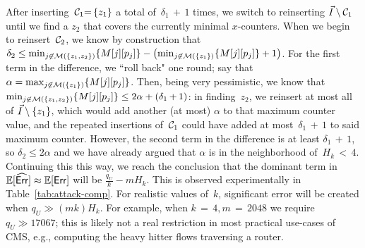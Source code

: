 After inserting~$\mathcal{C}_1{=}\,\{z_1\}$ a total of~$\delta_1\,{+}\,1$ times, we switch to reinserting $\vec{I}\setminus \mathcal{C}_1$ until we find a $z_2$ that covers the currently minimal $x$-counters.  When we begin to reinsert~$\mathcal{C}_2$, we know by construction that $\delta_2 \leq \min_{j \not\in \mathcal{M}(\{z_1,z_2\})}\{M[j][p_j]\} - \left(\min_{j \not\in \mathcal{M}(\{z_1\})}\{M[j][p_j]\}+1\right)$.  For the first term in the difference, we ``roll back" one round; say that $\alpha=\max_{j \not\in \mathcal{M}(\{z_1\})}\{M[j][p_j]\}$. Then, being very pessimistic, we know that $\min_{j \not\in \mathcal{M}(\{z_1,z_2\})}\{M[j][p_j]\} \leq 2\alpha + (\delta_1\,{+}\,1)$: in finding~$z_2$, we reinsert at most all of $\vec{I}\setminus\{z_1\}$, which would add another (at most) $\alpha$ to that maximum counter value, and the repeated insertions of~$\mathcal{C}_1$ could have added at most~$\delta_1\,{+}\,1$ to said maximum counter.  However, the second term in the difference is at least $\delta_1\,{+}\,1$, so $\delta_2 \leq 2\alpha$ and we have already argued that $\alpha$ is in the neighborhood of~$H_k \,{<}\, 4$.  Continuing this this way, we reach the conclusion that 
the dominant term in $\mathbb{E}[\widehat{\mathsf{Err}}] \approx \mathbb{E}[\mathsf{Err}]$ will be $\frac{q_U}{k}-mH_k$. This is observed experimentally in Table~\ref{tab:attack-comp}. For realistic values of~$k$, significant error will be created when $q_U \gg (mk)H_k$. For example, when $k\,{=}\,4, m\,{=}\,2048$ we require $q_U \gg 17067$; this is likely not a real restriction in most practical use-cases of CMS, e.g., computing the heavy hitter flows traversing a router.


